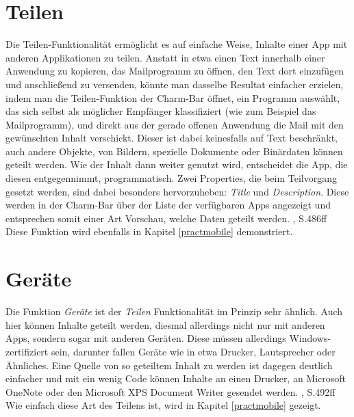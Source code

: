 \documentclass[a4paper,bibtotoc,oneside]{scrbook}
\begin{document}
\section[Teilen]{Teilen}\label{ref:share}
Die Teilen-Funktionalität ermöglicht es auf einfache Weise, Inhalte einer App mit anderen Applikationen zu teilen. Anstatt in etwa einen Text innerhalb einer Anwendung zu kopieren, das Mailprogramm zu öffnen, den Text dort einzufügen und anschließend zu versenden, könnte man dasselbe Resultat einfacher erzielen, indem man die Teilen-Funktion der Charm-Bar öffnet, ein Programm auswählt, das sich selbst als möglicher Empfänger klassifiziert (wie zum Beispiel das Mailprogramm), und direkt aus der gerade offenen Anwendung die Mail mit den gewünschten Inhalt verschickt.
\newline
\newline
Dieser ist dabei keinesfalls auf Text beschränkt, auch andere Objekte, von Bildern, spezielle Dokumente oder Binärdaten können geteilt werden. Wie der Inhalt dann weiter genutzt wird, entscheidet die App, die diesen entgegennimmt, programmatisch.
\newline
Zwei Properties, die beim Teilvorgang gesetzt werden, sind dabei besonders hervorzuheben: \textit{Title} und \textit{Description}. Diese werden in der Charm-Bar über der Liste der verfügbaren Apps angezeigt und entsprechen somit einer Art Vorschau, welche Daten geteilt werden. \cite {ana12}, S.486ff
\newline
Diese Funktion wird ebenfalls in Kapitel \ref{practmobile} demonstriert.

\section[Geräte]{Geräte}
Die Funktion \textit{Geräte} ist der \textit{Teilen} Funktionalität im Prinzip sehr ähnlich. Auch hier können Inhalte geteilt werden, diesmal allerdings nicht nur mit anderen Apps, sondern sogar mit anderen Geräten. Diese müssen allerdings Windows-zertifiziert sein, darunter fallen Geräte wie in etwa Drucker, Lautsprecher oder Ähnliches. Eine Quelle von so geteiltem Inhalt zu werden ist dagegen deutlich einfacher und mit ein wenig Code können Inhalte an einen Drucker, an Microsoft OneNote oder den Microsoft XPS Document Writer gesendet werden. \cite {ana12}, S.492ff
\newline
\newline
Wie einfach diese Art des Teilens ist, wird in Kapitel \ref{practmobile} gezeigt.
\end{document}
